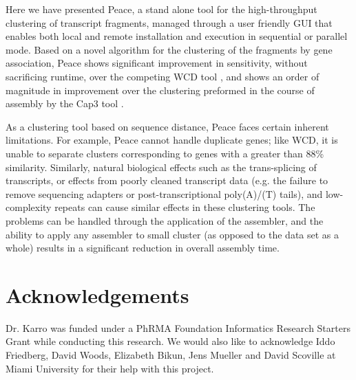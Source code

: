 \documentclass[a4,center,fleqn]{NAR}
\begin{document}
Here we have presented {\sc Peace}, a stand alone tool for the
high-throughput clustering of transcript fragments, managed through a
user friendly GUI that enables both local and remote installation and
execution in sequential or parallel mode.  Based on a novel algorithm
for the clustering of the fragments by gene association, {\sc Peace}
shows significant improvement in sensitivity, without sacrificing runtime,
over the competing {\sc WCD} tool \cite{Hazelhurst08a}, and shows an
order of magnitude in improvement over the clustering preformed in the
course of assembly by the {\sc Cap3} tool \cite{Huang99}.

As a clustering tool based on sequence distance, {\sc Peace} faces
certain inherent limitations. For example, {\sc Peace} cannot handle
duplicate genes; like {\sc WCD}, it is unable to separate clusters
corresponding to genes with a greater than 88\% similarity.
Similarly, natural biological effects such as the trans-splicing of
transcripts, or effects from poorly cleaned transcript data (e.g. the
failure to remove sequencing adapters or post-transcriptional
poly(A)/(T) tails), and low-complexity repeats can cause similar
effects in these clustering tools.  The problems can be handled
through the application of the assembler, and the ability to apply any
assembler to small cluster (as opposed to the data set as a whole)
results in a significant reduction in overall assembly time.

\section{Acknowledgements}

Dr. Karro was funded under a PhRMA Foundation Informatics Research
Starters Grant while conducting this research.  We would also like to
acknowledge Iddo Friedberg, David Woods, Elizabeth Bikun, Jens Mueller and David
Scoville at Miami University for their help with this project.

\vspace{3mm}


\end{document}
